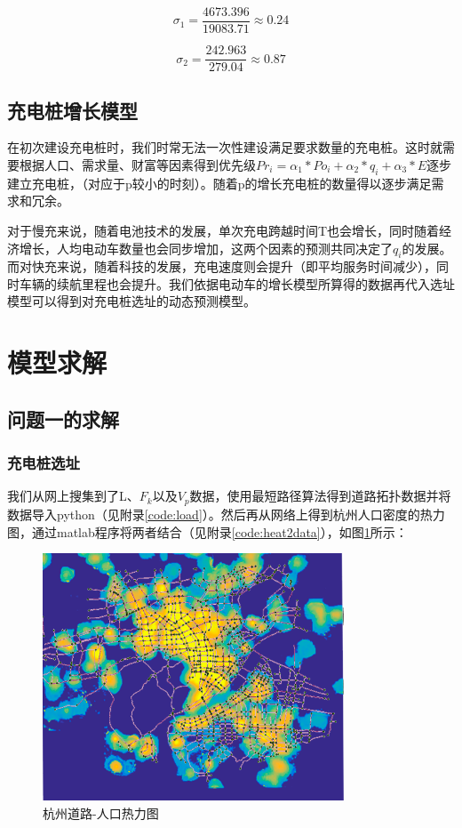 \documentclass[12pt, a4paper, oneside]{ctexart}
\begin{document}
\begin{equation}
  \sigma_1=\frac{4673.396}{19083.71}\approx0.24
\end{equation}

\begin{equation}
  \sigma_2= \frac{242.963}{279.04} \approx0.87
\end{equation}


\subsection{充电桩增长模型}
在初次建设充电桩时，我们时常无法一次性建设满足要求数量的充电桩。这时就需要根据人口、需求量、财富等因素得到优先级\(Pr_i=\alpha_1*Po_i+\alpha_2*q_i+\alpha_3*E\)逐步建立充电桩，（对应于p较小的时刻）。随着p的增长充电桩的数量得以逐步满足需求和冗余。

对于慢充来说，随着电池技术的发展，单次充电跨越时间T也会增长，同时随着经济增长，人均电动车数量也会同步增加，这两个因素的预测共同决定了\(q_i\)的发展。而对快充来说，随着科技的发展，充电速度则会提升（即平均服务时间减少），同时车辆的续航里程也会提升。我们依据电动车的增长模型所算得的数据再代入选址模型可以得到对充电桩选址的动态预测模型。



\section{模型求解}
\subsection{问题一的求解}
\subsubsection{充电桩选址}
我们从网上搜集到了L、\(F_k\)以及\(V_p\)数据，使用最短路径算法得到道路拓扑数据并将数据导入python（见附录\ref{code:load}）。然后再从网络上得到杭州人口密度的热力图，通过matlab程序将两者结合（见附录\ref{code:heat2data}），如图\ref{fig:heat}所示：

\begin{figure}[H]
    \centering
    \includegraphics[width=0.8\textwidth]{pic/杭州道路-热力图.png}
    \caption{杭州道路-人口热力图}
    \label{fig:heat}
\end{figure}
\end{document}
